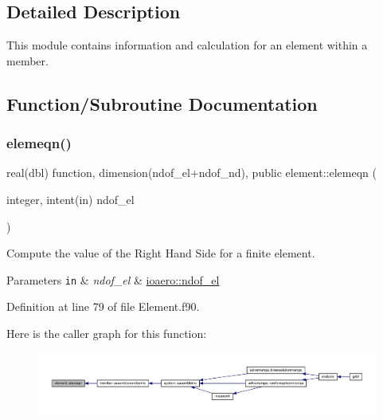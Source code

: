 \subsection{Detailed Description}
This module contains information and calculation for an element within a member. 

\subsection{Function/\+Subroutine Documentation}
\mbox{\label{namespaceelement_a267c29ec99208b5121ba2c6af7180016}} 
\subsubsection{\texorpdfstring{elemeqn()}{elemeqn()}}
{\footnotesize\ttfamily real(dbl) function, dimension(ndof\+\_\+el+ndof\+\_\+nd), public element\+::elemeqn (\begin{DoxyParamCaption}\item[{integer, intent(in)}]{ndof\+\_\+el }\end{DoxyParamCaption})}



Compute the value of the Right Hand Side for a finite element. 


\begin{DoxyParams}[1]{Parameters}
\mbox{\tt in}  & {\em ndof\+\_\+el} & \hyperlink{namespaceioaero_a2b095b5cb5aab1f100d202c8004c9cb5}{ioaero\+::ndof\+\_\+el} \\
\hline
\end{DoxyParams}


Definition at line 79 of file Element.\+f90.

Here is the caller graph for this function\+:\nopagebreak
\begin{figure}[H]
\begin{center}
\leavevmode
\includegraphics[width=350pt]{namespaceelement_a267c29ec99208b5121ba2c6af7180016_icgraph}
\end{center}
\end{figure}
\mbox{\label{namespaceelement_a172c175acb51f133e8b15a64c6e7f238}} 
